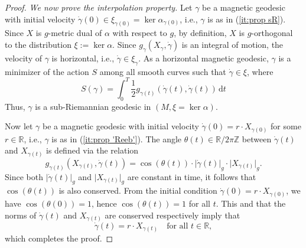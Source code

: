 \documentclass[11pt,reqno]{amsart}
\newcommand{\IR}{{\mathbb R}}%
\newcommand{\IZ}{{\mathbb Z}}%
\theoremstyle{plain}
\theoremstyle{definition}
\numberwithin{equation}{section}
\def\a{\alpha}
\def\d{\delta}
\def\a{\alpha}
\def\d{\delta}
\def\d{{\mathrm{d}}}
\newcommand{\gc}{\gamma}
\newcommand{\dgc}{\dot{\gc}}
\begin{document}
\begin{proof}
\textit{We now prove the interpolation property.} Let $\gamma$ be a magnetic geodesic with initial velocity $\dgc(0)\in \xi_{\gc(0)}=\ker\alpha_{\gc(0)}$, i.e., $\gamma$ is as in (\ref{it:prop sR}). Since $X$ is $g$-metric dual of $\a$ with respect to $g$, by definition, $X$ is $g$-orthogonal to the distribution $\xi:=\ker\alpha$. Since $g_{\gamma}(X_{\gamma}, \dot{\gamma})$ is an integral of motion, the velocity of $\gamma$ is horizontal, i.e., $\dgc\in \xi_{\gc}$.
As a horizontal magnetic geodesic, $\gamma$ is a minimizer of the action $S$ among all smooth curves such that $\dgc \in \xi$, where 
\[
	S(\gamma)= \int_0^T \frac{1}{2}g_{\gc(t)}(\dgc(t),\dgc(t)) \, \d t
\]
Thus, $\gamma$ is a sub-Riemannian geodesic in $(M, \xi=\ker \alpha)$.

Now let \( \gamma \) be a magnetic geodesic with initial velocity \( \dot{\gamma}(0) = r \cdot X_{\gamma(0)} \) for some \( r \in \mathbb{R} \), i.e., $\gamma$ is as in (\ref{it:prop 'Reeb'}).
The angle \( \theta(t) \in \IR/2\pi \IZ \) between \( \dot{\gamma}(t) \) and \( X_{\gamma(t)} \) is defined via the relation
\begin{equation}\label{eq: def angle veleocity and X}
    g_{\gamma(t)}(X_{\gamma(t)}, \dot{\gamma}(t)) = \cos(\theta(t)) \cdot \lvert \dot{\gamma}(t) \rvert_g \cdot \lvert X_{\gamma(t)} \rvert_g.
\end{equation}
Since both \( \lvert \dot{\gamma}(t) \rvert_g \) and \( \lvert X_{\gamma(t)} \rvert_g \) are constant in time, it follows that \( \cos(\theta(t)) \) is also conserved. From the initial condition \( \dot{\gamma}(0) = r \cdot X_{\gamma(0)} \), we have \( \cos(\theta(0)) = 1 \), hence \( \cos(\theta(t)) = 1 \) for all \( t \). This and that the norms of $\dot{\gamma}(t)$ and $X_{\gamma(t)}$ are conserved respectively imply that
\[
    \dot{\gamma}(t) = r \cdot X_{\gamma(t)} \quad \text{for all } t \in \mathbb{R},
\]
which completes the proof.
\end{proof}
\end{document}
